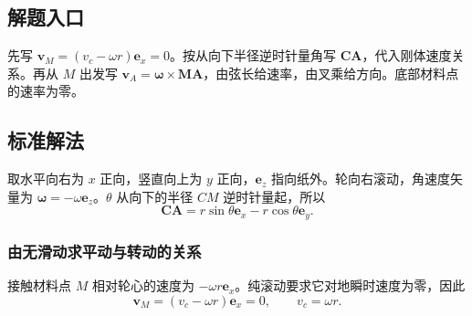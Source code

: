 \documentclass[UTF8,fontset=fandol,a4paper,11pt]{ctexart}
\newcommand{\vect}[1]{\bm{#1}}
\begin{document}


\subsection*{解题入口}

先写 $\vect v_M=(v_c-\omega r)\vect e_x=0$。按从向下半径逆时针量角写 $\vect{CA}$，代入刚体速度关系。再从 $M$ 出发写 $\vect v_A=\vect\omega\times\vect{MA}$，由弦长给速率，由叉乘给方向。底部材料点的速率为零。



\subsection*{标准解法}

取水平向右为 $x$ 正向，竖直向上为 $y$ 正向，$\vect e_z$ 指向纸外。轮向右滚动，角速度矢量为 $\vect\omega=-\omega\vect e_z$。$\theta$ 从向下的半径 $CM$ 逆时针量起，所以
\[
\vect{CA}=r\sin\theta\vect e_x-r\cos\theta\vect e_y.
\]
\subsubsection*{由无滑动求平动与转动的关系}
接触材料点 $M$ 相对轮心的速度为 $-\omega r\vect e_x$。纯滚动要求它对地瞬时速度为零，因此
\[
\vect v_M=(v_c-\omega r)\vect e_x=0,
\qquad v_c=\omega r.
\]
\end{document}
